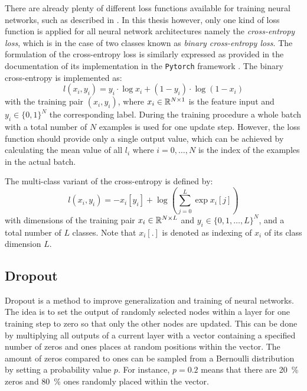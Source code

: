 There are already plenty of different loss functions available for training neural networks, such as described in \cite{LeCun2006}. 
In this thesis however, only one kind of loss function is applied for all neural network architectures namely the \emph{cross-entropy loss}, which is in the case of two classes known as \emph{binary cross-entropy loss}.
The formulation of the cross-entropy loss is similarly expressed as provided in the documentation of its implementation in the \texttt{Pytorch} framework \cite{Pytorch}.
The binary cross-entropy is implemented as:
\begin{equation}\label{eq:nn_theory_binary_cross_entropy}
  l(x_i, y_i) = y_i \cdot \log x_i + (1 - y_i) \cdot \log (1 - x_i)
\end{equation}
with the training pair $(x_i, y_i)$, where $x_i \in \mathbb{R}^{N \times 1}$ is the feature input and $y_i \in \{0, 1\}^N$ the corresponding label.
During the training procedure a whole batch with a total number of $N$ examples is used for one update step.
However, the loss function should provide only a single output value, which can be achieved by calculating the mean value of all $l_i$ where $i = 0, \dots, N$ is the index of the examples in the actual batch.

The multi-class variant of the cross-entropy is defined by:
\begin{equation}
  l(x_i, y_i) = - x_i[y_i] + \log{\left( \sum_{j=0}^{L} \exp{x_i[j]} \right)}
\end{equation}
with dimensions of the training pair $x_i \in \mathbb{R}^{N \times L}$ and $y_i \in \{0, 1, \dots, L\}^N$, and a total number of $L$ classes.
Note that $x_i[.]$ is denoted as indexing of $x_i$ of its class dimension $L$. 



\subsection{Dropout}
Dropout \cite{Hinton2012} is a method to improve generalization and training of neural networks.
The idea is to set the output of randomly selected nodes within a layer for one training step to zero so that only the other nodes are updated.
This can be done by multiplying all outputs of a current layer with a vector containing a specified number of zeros and ones places at random positions within the vector.
The amount of zeros compared to ones can be sampled from a Bernoulli distribution by setting a probability value $p$.
For instance, $p=0.2$ means that there are \SI{20}{\percent} zeros and \SI{80}{\percent} ones randomly placed within the vector.


